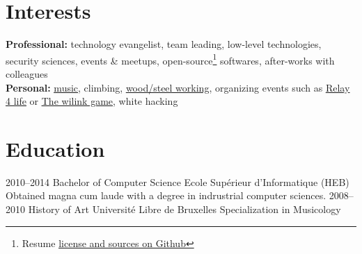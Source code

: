 \documentclass[]{friggeri-cv} %
\begin{document}

\section{Interests}

\textbf{Professional:} technology evangelist, team leading, low-level technologies, security sciences, events \& meetups, open-source\footnote{Resume \href{https://github.com/rmedaer/me}{\ul{license and sources on Github}}} softwares, after-works with colleagues \\
\textbf{Personal:}
\href{https://www.facebook.com/majorset}{\ul{music}},
climbing,
\href{https://www.lairdubois.fr/pas-a-pas/268-meuble-tv-chester-2.html}{\ul{wood/steel working}},
organizing events such as \href{http://www.relaispourlavie.be/relays/braine-lalleud-2017#block-views-stkrfl-contacts-main-block-1}{\ul{Relay 4 life}} or \href{https://www.palais12.com/en/events/detail/the-wilink-game-2019/}{\ul{The wilink game}},
white hacking


\section{Education}

\begin{entrylist}
\entry
{2010--2014}
{Bachelor {\normalfont of Computer Science}}
{Ecole Supérieur d'Informatique (HEB)}
{Obtained magna cum laude with a degree in indrustrial computer sciences.}
\entry
{2008--2010}
{{\normalfont History of Art}}
{Université Libre de Bruxelles}
{Specialization in Musicology}
\end{entrylist}
\end{document}
